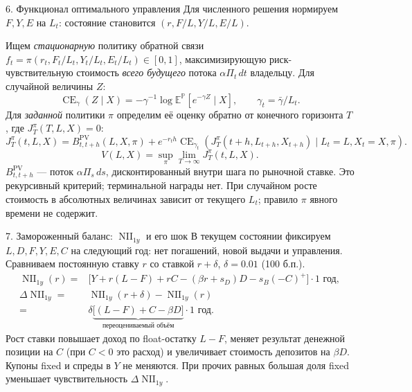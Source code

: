 \documentclass[aspectratio=169,11pt]{beamer}
\newcommand{\CE}{\operatorname{CE}}
\newcommand{\NII}{\operatorname{NII}}
\newcommand{\E}{\mathbb E}
\newcommand{\Pp}{\mathbb P}
\begin{document}
\begin{frame}{6. Функционал оптимального управления}
\small
Для численного решения нормируем $F,Y,E$ на $L_t$:
состояние становится $(r,F/L,Y/L,E/L)$.

Ищем \emph{стационарную} политику обратной связи
$f_t=\pi(r_t,F_t/L_t,Y_t/L_t,E_t/L_t)\in[0,1]$,
максимизирующую риск-чувствительную стоимость \emph{всего будущего}
потока $\alpha\Pi_t\,dt$ владельцу.
Для случайной величины $Z$:
\[
\CE_\gamma(Z\mid X)
=-\gamma^{-1}\log\E^{\Pp}[e^{-\gamma Z}\mid X],
\qquad \gamma_t=\bar\gamma/L_t.
\]
Для \emph{заданной} политики $\pi$ определим её оценку обратно
от конечного горизонта $T$, где $J_T^\pi(T,L,X)=0$:
\[
J_T^\pi(t,L,X)=B_{t,t+h}^{\mathrm{PV}}(L,X,\pi)
+e^{-r_th}\CE_{\gamma_t}\!\left(
J_T^\pi(t+h,L_{t+h},X_{t+h})\mid L_t=L,X_t=X,\pi\right).
\]
\[
\boxed{\displaystyle V(L,X)=\sup_\pi\lim_{T\to\infty}J_T^\pi(t,L,X).}
\]
\footnotesize
$B_{t,t+h}^{\mathrm{PV}}$ --- поток $\alpha\Pi_s\,ds$,
дисконтированный внутри шага по рыночной ставке.
Это рекурсивный критерий; терминальной награды нет.
При случайном росте стоимость в абсолютных величинах зависит от
текущего $L_t$; правило $\pi$ явного времени не содержит.
\end{frame}

\begin{frame}{7. Замороженный баланс: $\NII_{1y}$ и его шок}
\small
В текущем состоянии фиксируем $L,D,F,Y,E,C$ на следующий год:
нет погашений, новой выдачи и управления.
Сравниваем постоянную ставку $r$ со ставкой $r+\delta$,
$\delta=0.01$ (100 б.п.).
\begin{align*}
\NII_{1y}(r)={}&
\bigl[Y+r(L-F)+rC-(\beta r+s_D)D-s_B(-C)^+\bigr]
\cdot1\text{ год},\\[0.6em]
\Delta\NII_{1y}={}&\NII_{1y}(r+\delta)-\NII_{1y}(r)\\
={}&\delta\underbrace{\bigl[(L-F)+C-\beta D\bigr]}_{
\text{переоцениваемый объём}}\cdot1\text{ год}.
\end{align*}
\footnotesize
Рост ставки повышает доход по float-остатку $L-F$,
меняет результат денежной позиции на $C$ (при $C<0$ это расход)
и увеличивает стоимость депозитов на $\beta D$.
Купоны fixed и спреды в $Y$ не меняются.
При прочих равных большая доля fixed уменьшает чувствительность
$\Delta\NII_{1y}$.
\end{frame}
\end{document}
